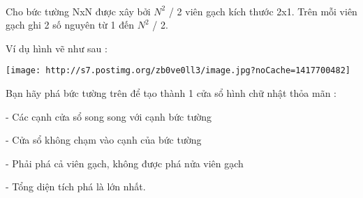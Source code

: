  

Cho bức tường NxN được xây bởi $N^{2}$ / 2 viên gạch kích thước 2x1. Trên mỗi viên gạch ghi 2 số nguyên từ 1 đến $N^{2}$ / 2.

Ví dụ hình vẽ như sau :


\texttt{[image: http://s7.postimg.org/zb0ve0ll3/image.jpg?noCache=1417700482]}

Bạn hãy phá bức tường trên để tạo thành 1 cửa sổ hình chữ nhật thỏa mãn :

- Các cạnh cửa sổ song song với cạnh bức tường

- Cửa sổ không chạm vào cạnh của bức tường

- Phải phá cả viên gạch, không được phá nửa viên gạch

- Tổng diện tích phá là lớn nhất.

 